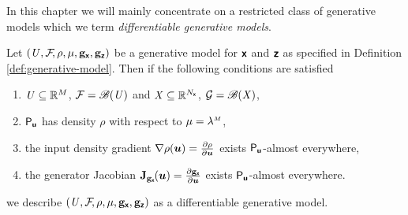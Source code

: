 
In this chapter we will mainly concentrate on a restricted class of generative models which we term \emph{differentiable generative models}.

\begin{definition}\label{def:differentiable-generative-model}
Let $(\mathit{U},\mathcal{F}\kern-2pt,\rho,\mu,{\mathbf{g}}_{\boldsymbol{\mathsf{x}}},{\mathbf{g}}_{\boldsymbol{\mathsf{z}}})$ be a generative model for $\boldsymbol{\mathsf{x}}$ and $\boldsymbol{\mathsf{z}}$ as specified in Definition \ref{def:generative-model}. Then if the following conditions are satisfied
\begin{enumerate}
\item
$\mathit{U} \subseteq \mathbb{R}^M$, $\mathcal{F} = \mathscr{B}(\mathit{U})$ and $\mathit{X} \subseteq \mathbb{R}^{N_{\boldsymbol{\mathsf{x}}}}$, $\mathcal{G} = \mathscr{B}(\mathit{X})$, %
\item
$\mathsf{P}_{\boldsymbol{\mathsf{u}}}$ has density $\rho$ with respect to $\mu = \lebm{M}$, 
\item
the input density gradient $\grad{\rho}{\vct{u}} = \pd{\rho}{\vct{u}}$ exists $\mathsf{P}_{\boldsymbol{\mathsf{u}}}$-almost everywhere, 
\item
the generator Jacobian $\jacob{\genfunc_{\rvct{x}}}{\vct{u}} = \pd{\genfunc_{\rvct{x}}}{\vct{u}}$ exists $\mathsf{P}_{\boldsymbol{\mathsf{u}}}$-almost everywhere.
\end{enumerate}
we describe $(\mathit{U},\mathcal{F}\kern-2pt,\rho,\mu,{\mathbf{g}}_{\boldsymbol{\mathsf{x}}},{\mathbf{g}}_{\boldsymbol{\mathsf{z}}})$ as a differentiable generative model.
\end{definition}


